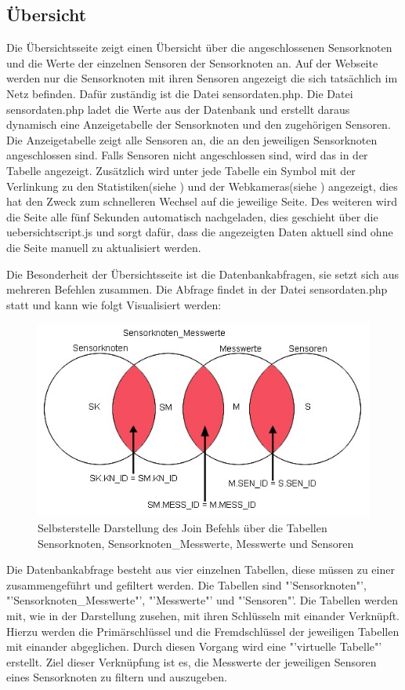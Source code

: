 \subsection{Übersicht}\label{Uebersicht}
Die Übersichtsseite zeigt einen Übersicht über die angeschlossenen Sensorknoten und die Werte der einzelnen Sensoren der Sensorknoten an. Auf der Webseite werden nur die Sensorknoten mit ihren Sensoren angezeigt die sich tatsächlich im Netz befinden. Dafür zuständig ist die Datei sensordaten.php. Die Datei sensordaten.php ladet die Werte aus der Datenbank und erstellt daraus dynamisch eine Anzeigetabelle der Sensorknoten und den zugehörigen Sensoren. Die Anzeigetabelle zeigt alle Sensoren an, die an den jeweiligen Sensorknoten angeschlossen sind. Falls Sensoren nicht angeschlossen sind, wird das in der Tabelle angezeigt. Zusätzlich wird unter jede Tabelle ein Symbol mit der Verlinkung zu den Statistiken(siehe ) und der Webkameras(siehe ) angezeigt, dies hat den Zweck zum schnelleren Wechsel auf die jeweilige Seite. Des weiteren wird die Seite alle fünf Sekunden automatisch nachgeladen, dies geschieht über die uebersichtscript.js und sorgt dafür, dass die angezeigten Daten aktuell sind ohne die Seite manuell zu aktualisiert werden.

Die Besonderheit der Übersichtsseite ist die Datenbankabfragen, sie setzt sich aus mehreren Befehlen zusammen. Die Abfrage findet in der Datei sensordaten.php statt und kann wie folgt Visualisiert werden:
\begin{figure}[htp]
	\includegraphics[width=\textwidth]{Bilder/Kapitel4/uebersichtjoin.jpg}
	\caption[Mengendarstellung der Übersichtsseite]{Selbsterstelle Darstellung des Join Befehls über die Tabellen Sensorknoten, Sensorknoten\_Messwerte, Messwerte und Sensoren}
	\label{fig:Kapitel4/uebersichtjoin.jpg}
\end{figure}
Die Datenbankabfrage besteht aus vier einzelnen Tabellen, diese müssen zu einer zusammengeführt und gefiltert werden. Die Tabellen sind "'Sensorknoten"', "'Sensorknoten\_Messwerte"', "'Messwerte"' und "'Sensoren"'. Die Tabellen werden mit, wie in der Darstellung zusehen, mit ihren Schlüsseln mit einander Verknüpft. Hierzu werden die Primärschlüssel und die Fremdschlüssel der jeweiligen Tabellen mit einander abgeglichen. Durch diesen Vorgang wird eine "'virtuelle Tabelle"' erstellt. Ziel dieser Verknüpfung ist es, die Messwerte der jeweiligen Sensoren eines Sensorknoten zu filtern und auszugeben.

